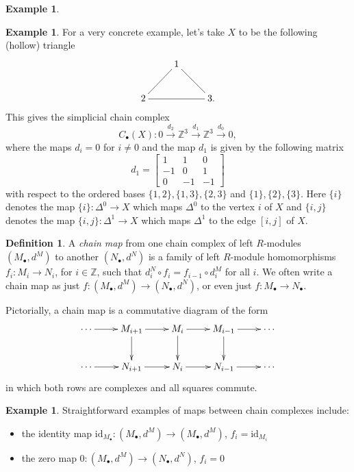 \documentclass{amsart}[12pt]
\newcommand{\id}{\mathrm{id}}
\newcommand{\Z}{\mathbb{Z}}
\numberwithin{equation}{section}
\theoremstyle{plain} %
\theoremstyle{definition}
\newtheorem{defn}[equation]{Definition}
\newtheorem{ex}[equation]{Example}
\theoremstyle{remark}
\newcommand{\xra}[1]{\xrightarrow{#1}}
\begin{document}
\begin{ex}
\begin{ex}
  For a very concrete example, let's take $X$ to be the following (hollow) triangle 
  \[
 \xymatrix{
  & 1\ar@{-}[dl]\ar@{-}[dr] &\\
  2 \ar@{-}[rr] & & 3. 
}
  \]    
  This gives the simplicial chain complex
  \[
 C_\bullet(X):  0 \xra{d_2} \Z^3 \xra{d_1} \Z^3 \xra{d_0} 0, 
  \]
  where the maps $d_i=0$ for $i\neq 0$ and the map $d_1$ is given by the following matrix 
  \[
  d_1=\begin{bmatrix}
  1 & 1 & 0 \\
  -1 & 0 & 1\\
  0 & -1 & -1
  \end{bmatrix}
  \]
  with respect to the ordered bases $\{1,2\}, \{1,3\}, \{2,3\}$  and  $\{1\}, \{2\}, \{3\}$. Here $\{i\}$ denotes the map 
  $\{i\}: \Delta^0\to X$ which maps $\Delta^0$ to the vertex $i$ of $X$ and $\{i,j\}$ denotes the map 
  $\{i,j\}: \Delta^1\to X$ which maps $\Delta^1$ to the edge $[i,j]$ of $X$.
    \end{ex}

    

\begin{defn}    
    A {\em chain map} from one chain complex of left $R$-modules 
    $(M_\bullet, d^M)$ to another $(N_\bullet, d^N)$ is a family of left $R$-module homomorphisms $f_i: M_i \to N_i$, for $i \in \Z$, such that $d_i^N \circ f_i = f_{i-1} \circ d_i^M$ for all $i$.  We often write a chain map as just $f: (M_\bullet,d^M) \to (N_\bullet,d^N)$, or even just $f: M_\bullet \to N_\bullet$.
\end{defn}


Pictorially, a chain map is a commutative diagram of the form
$$
\xymatrix{
\cdots \ar[r] & M_{i+1} \ar[r] \ar[d] & M_i \ar[r] \ar[d] & M_{i-1} \ar[r] \ar[d] & \cdots \\
\cdots \ar[r] & N_{i+1} \ar[r]  & N_i \ar[r]  & N_{i-1} \ar[r]  & \cdots \\
}
$$
in which both rows are complexes and all squares commute. 

\begin{ex}
Straightforward examples of maps between chain complexes include:
\begin{itemize}
\item the identity map $\id_{M_\bullet}:(M_\bullet ,d^M)\to (M_\bullet ,d^M)$, $f_i=\id_{M_i}$
\item the zero map $0:(M_\bullet ,d^M)\to (N_\bullet ,d^N)$, $f_i=0$
\end{itemize}
\end{ex}


\end{ex}
\end{document}

